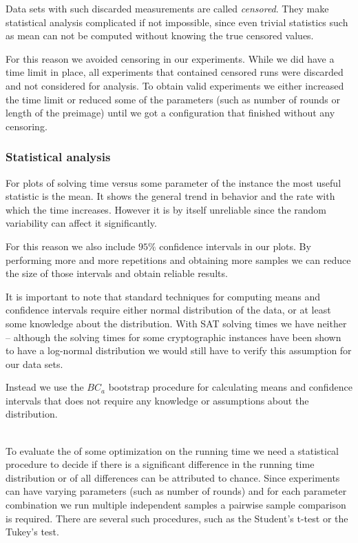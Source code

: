 Data sets with such discarded measurements are called \emph{censored}.
They make statistical analysis complicated if not impossible, since even trivial statistics such as mean can not be computed without knowing the true censored values.

For this reason we avoided censoring in our experiments.
While we did have a time limit in place, all experiments that contained censored runs were discarded and not considered for analysis.
To obtain valid experiments we either increased the time limit or reduced some of the parameters (such as number of rounds or length of the preimage) until we got a configuration that finished without any censoring.

\subsubsection{Statistical analysis}
For plots of solving time versus some parameter of the instance the most useful statistic is the mean.
It shows the general trend in behavior and the rate with which the time increases.
However it is by itself unreliable since the random variability can affect it significantly.

For this reason we also include $95\%$ confidence intervals in our plots.
By performing more and more repetitions and obtaining more samples we can reduce the size of those intervals and obtain reliable results.

It is important to note that standard techniques for computing means and confidence intervals require either normal distribution of the data, or at least some knowledge about the distribution.
With SAT solving times we have neither -- although the solving times for some cryptographic instances have been shown \cite{bard2007efficient} to have a log-normal distribution we would still have to verify this assumption for our data sets.

Instead we use the $BC_a$ bootstrap procedure \cite{diciccio1996bootstrap} for calculating means and confidence intervals that does not require any knowledge or assumptions about the distribution.

~\\

To evaluate the  of some optimization on the running time we need a statistical procedure to decide if there is a significant difference in the running time distribution or of all differences can be attributed to chance.
Since experiments can have varying parameters (such as number of rounds) and for each parameter combination we run multiple independent samples a pairwise sample comparison is required.
There are several such procedures, such as the Student's t-test or the Tukey's test.

